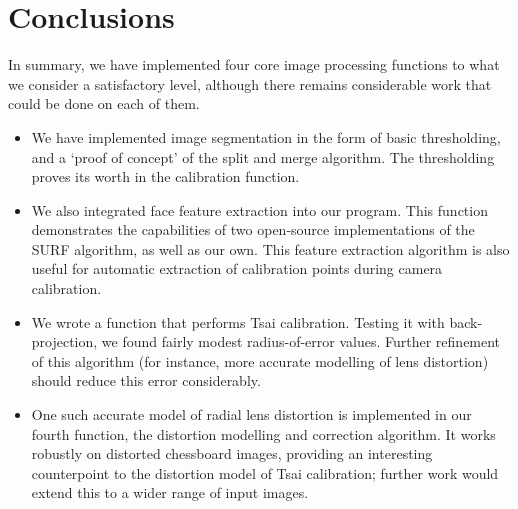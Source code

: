 
\section{Conclusions}
\label{sec:conclusions}

In summary, we have implemented four core image processing functions to what we consider a satisfactory level, although there remains considerable work that could be done on each of them.
\begin{itemize}
  \item We have implemented image segmentation in the form of basic thresholding, and a `proof of concept' of the split and merge algorithm. The thresholding proves its worth in the calibration function.
  \item We also integrated face feature extraction into our program. This function demonstrates the capabilities of two open-source implementations of the SURF algorithm, as well as our own. This feature extraction algorithm is also useful for automatic extraction of calibration points during camera calibration.
  \item We wrote a function that performs Tsai calibration. Testing it with back-projection, we found fairly modest radius-of-error values. Further refinement of this algorithm (for instance, more accurate modelling of lens distortion) should reduce this error considerably.
  \item One such accurate model of radial lens distortion is implemented in our fourth function, the distortion modelling and correction algorithm. It works robustly on distorted chessboard images, providing an interesting counterpoint to the distortion model of Tsai calibration; further work would extend this to a wider range of input images.
\end{itemize}
